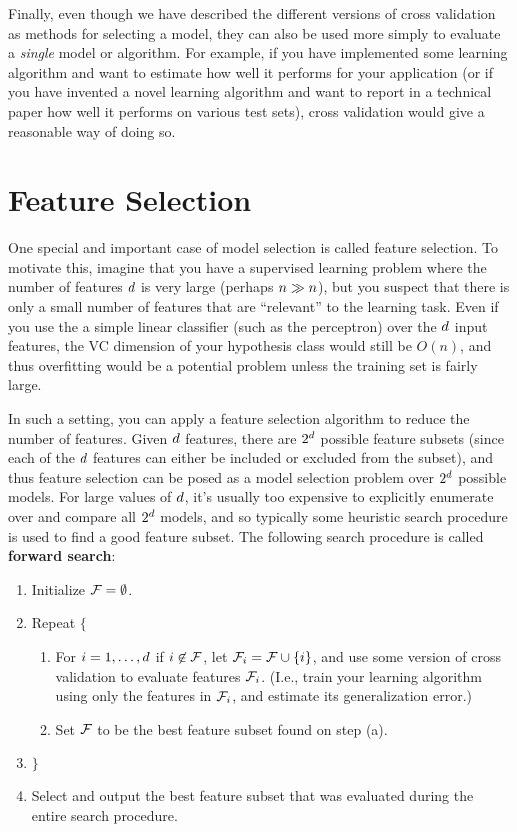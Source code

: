 \documentclass{article}
\begin{document}
Finally, even though we have described the different versions of 
cross validation as methods for selecting a model, they can 
also be used more simply to evaluate a \emph{single} model 
or algorithm.  For example, if you have implemented some learning 
algorithm and want to estimate how well it performs for your 
application (or if you have invented a novel learning algorithm 
and want to report in a technical paper how well it performs on 
various test sets), cross validation would give a reasonable
way of doing so.

\section{Feature Selection}

One special and important case of model selection is called 
feature selection.  To motivate this, imagine that you have 
a supervised learning problem where the number of features ${d}$ 
is very large (perhaps $n \gg {n}$), but you suspect that there is
only a small number of features that are ``relevant'' to the 
learning task.  
Even if you use the a simple linear classifier (such as the 
perceptron) over the ${d}$ input features, the VC dimension of 
your hypothesis class would still be $O(n)$, and thus 
overfitting would be a potential problem unless the 
training set is fairly large.

In such a setting, you can apply a feature selection algorithm to reduce
the number of features.  Given ${d}$ features, 
there are $2^{d}$ possible feature subsets (since each of the ${d}$
features can either be included or excluded from the subset), 
and thus feature selection can be 
posed as a model selection problem over $2^{d}$ possible models.  
For large values of ${d}$, it's usually too 
expensive to explicitly enumerate over and compare all $2^{d}$ models,
and so typically some heuristic search procedure is used to find a
good feature subset.  The following search procedure is called
{\bf forward search}: 
\begin{enumerate}
\item Initialize ${\cal F} = \emptyset$. 
\item Repeat $\{$
\begin{enumerate}
\item For $i=1,\ldots,{d}$ if $i \not\in {\cal F}$, let ${\cal F}_i = {\cal F} \cup \{i\}$,
and use some version of cross validation to evaluate features ${\cal F}_i$.  (I.e., 
train your learning algorithm using only the features in ${\cal F}_i$, and estimate
its generalization error.) 
\item Set ${\cal F}$ to be the best feature subset found on step (a).
\end{enumerate}
\item[] $\}$ 
\item Select and output the best feature subset that was evaluated 
during the entire search procedure. 
\end{enumerate}
\end{document}
